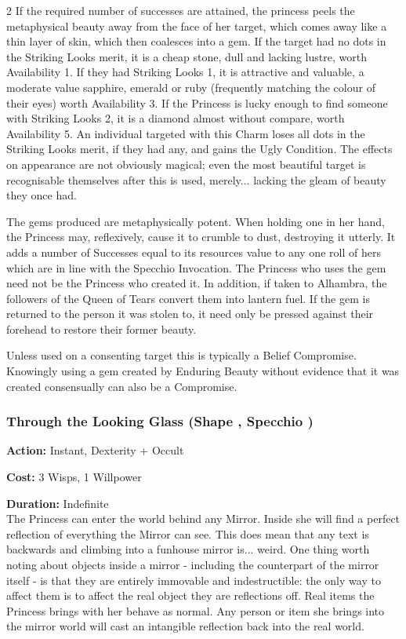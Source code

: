 \begin{multicols}{2}
If the required number of successes are attained, the princess peels the metaphysical beauty away from the face of her target, which comes away like a thin layer of skin, which then coalesces into a gem. If the target had no dots in the Striking Looks merit, it is a cheap stone, dull and lacking lustre, worth Availability 1. If they had Striking Looks 1, it is attractive and valuable, a moderate value sapphire, emerald or ruby (frequently matching the colour of their eyes) worth Availability 3. If the Princess is lucky enough to find someone with Striking Looks 2, it is a diamond almost without compare, worth Availability 5. An individual targeted with this Charm loses all dots in the Striking Looks merit, if they had any, and gains the Ugly Condition. The effects on appearance are not obviously magical; even the most beautiful target is recognisable themselves after this is used, merely... lacking the gleam of beauty they once had.

The gems produced are metaphysically potent. When holding one in her hand, the Princess may, reflexively, cause it to crumble to dust, destroying it utterly. It adds a number of Successes equal to its resources value to any one roll of hers which are in line with the Specchio Invocation. The Princess who uses the gem need not be the Princess who created it. In addition, if taken to Alhambra, the followers of the Queen of Tears convert them into lantern fuel. If the gem is returned to the person it was stolen to, it need only be pressed against their forehead to restore their former beauty.

Unless used on a consenting target this is typically a Belief Compromise. Knowingly using a gem created by Enduring Beauty without evidence that it was created consensually can also be a Compromise.
	
\subsubsection*{Through the Looking Glass (Shape \textbullet\textbullet\textbullet\textbullet, Specchio \textbullet\textbullet\textbullet\textbullet\textbullet)}

\noindent \textbf{Action:} Instant, Dexterity + Occult

\noindent \textbf{Cost:} 3 Wisps, 1 Willpower

\noindent \textbf{Duration:} Indefinite \\

\noindent The Princess can enter the world behind any Mirror. Inside she will find a perfect reflection of everything the Mirror can see. This does mean that any text is backwards and climbing into a funhouse mirror is... weird. One thing worth noting about objects inside a mirror - including the counterpart of the mirror itself - is that they are entirely immovable and indestructible: the only way to affect them is to affect the real object they are reflections off. Real items the Princess brings with her behave as normal. Any person or item she brings into the mirror world will cast an intangible reflection back into the real world.


\end{multicols}
